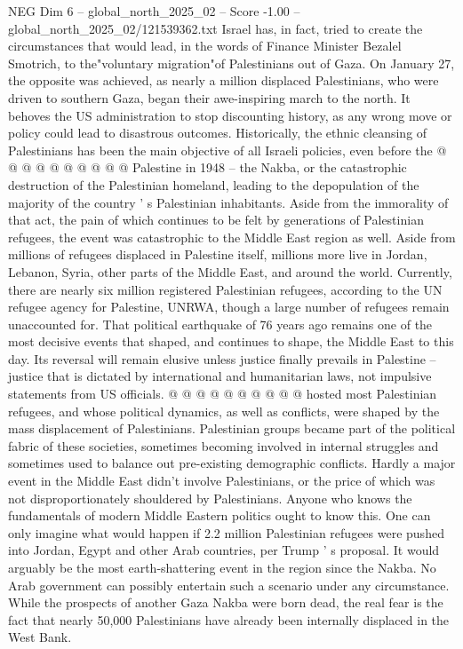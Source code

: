 \begin{textsample}{NEG Dim 6 – global\_north\_2025\_02 – Score -1.00 – global\_north\_2025\_02/121539362.txt}
Israel has, in fact, tried to create the circumstances that would lead, in the words of Finance Minister Bezalel Smotrich, to the"voluntary migration"of Palestinians out of Gaza.
On January 27, the opposite was achieved, as nearly a million displaced Palestinians, who were driven to southern Gaza, began their awe-inspiring march to the north.
It behoves the US administration to stop discounting history, as any wrong move or policy could lead to disastrous outcomes.
Historically, the ethnic cleansing of Palestinians has been the main objective of all Israeli policies, even before the @ @ @ @ @ @ @ @ @ @ Palestine in 1948 -- the Nakba, or the catastrophic destruction of the Palestinian homeland, leading to the depopulation of the majority of the country ' s Palestinian inhabitants.
Aside from the immorality of that act, the pain of which continues to be felt by generations of Palestinian refugees, the event was catastrophic to the Middle East region as well.
Aside from millions of refugees displaced in Palestine itself, millions more live in Jordan, Lebanon, Syria, other parts of the Middle East, and around the world.
Currently, there are nearly six million registered Palestinian refugees, according to the UN refugee agency for Palestine, UNRWA, though a large number of refugees remain unaccounted for.
That political earthquake of 76 years ago remains one of the most decisive events that shaped, and continues to shape, the Middle East to this day.
Its reversal will remain elusive unless justice finally prevails in Palestine -- justice that is dictated by international and humanitarian laws, not impulsive statements from US officials. @ @ @ @ @ @ @ @ @ @ hosted most Palestinian refugees, and whose political dynamics, as well as conflicts, were shaped by the mass displacement of Palestinians.
Palestinian groups became part of the political fabric of these societies, sometimes becoming involved in internal struggles and sometimes used to balance out pre-existing demographic conflicts.
Hardly a major event in the Middle East didn't involve Palestinians, or the price of which was not disproportionately shouldered by Palestinians.
Anyone who knows the fundamentals of modern Middle Eastern politics ought to know this.
One can only imagine what would happen if 2.2 million Palestinian refugees were pushed into Jordan, Egypt and other Arab countries, per Trump ' s proposal.
It would arguably be the most earth-shattering event in the region since the Nakba.
No Arab government can possibly entertain such a scenario under any circumstance.
While the prospects of another Gaza Nakba were born dead, the real fear is the fact that nearly 50,000 Palestinians have already been internally displaced in the West Bank.

\end{textsample}
